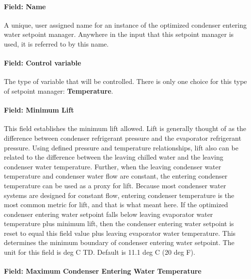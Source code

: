 \paragraph{Field: Name}\label{field-name-24-001}

A unique, user assigned name for an instance of the optimized condenser entering water setpoint manager. Anywhere in the input that this setpoint manager is used, it is referred to by this name.

\paragraph{Field: Control variable}\label{field-control-variable-18}

The type of variable that will be controlled. There is only one choice for this type of setpoint manager: \textbf{Temperature}.

\paragraph{Field: Minimum Lift}\label{field-minimum-lift-1}

This field establishes the minimum lift allowed. Lift is generally thought of as the difference between condenser refrigerant pressure and the evaporator refrigerant pressure. Using defined pressure and temperature relationships, lift also can be related to the difference between the leaving chilled water and the leaving condenser water temperature. Further, when the leaving condenser water temperature and condenser water flow are constant, the entering condenser temperature can be used as a proxy for lift. Because most condenser water systems are designed for constant flow, entering condenser temperature is the most common metric for lift, and that is what meant here. If the optimized condenser entering water setpoint falls below leaving evaporator water temperature plus minimum lift, then the condenser entering water setpoint is reset to equal this field value plus leaving evaporator water temperature. This determines the minimum boundary of condenser entering water setpoint. The unit for this field is deg C TD. Default is 11.1 deg C (20 deg F).

\paragraph{Field: Maximum Condenser Entering Water Temperature}\label{field-maximum-condenser-entering-water-temperature}

